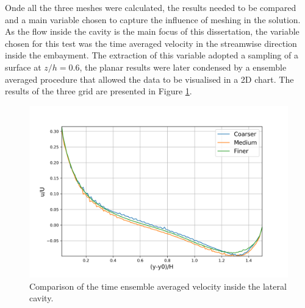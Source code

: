 \begin{refsection}
Onde all the three meshes were calculated, the results needed to be compared and a main variable chosen to capture the influence of meshing in the solution. As the flow inside the cavity is the main focus of this dissertation, the variable chosen for this test was the time averaged velocity in the streamwise direction inside the embayment. The extraction of this variable adopted a sampling of a surface at $z/h = 0.6$, the planar results were later condensed by a ensemble averaged procedure that allowed the data to be visualised in a 2D chart. The results of the three grid are presented in Figure \ref{fig:gciAllMeshes}.
\begin{figure}[!h]
\centering
\includegraphics[width=\linewidth]{../images/methods/gciAllMeshes.png}
\caption{Comparison of the time ensemble averaged velocity inside the lateral cavity.}
\label{fig:gciAllMeshes}
\end{figure}


\end{refsection}
